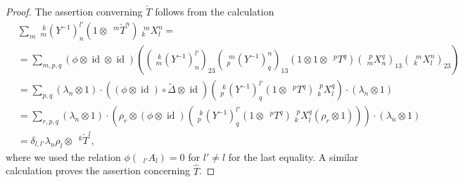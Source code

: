 \documentclass[12pt]{article}
\theoremstyle{change}
\DeclareMathOperator{\id}{id}
\newcommand{\Gr}[5]{\;{}^{\;#2}_{#4}#1_{#5}^{#3}}%
\newcommand{\Gru}[3]{\;{}^{\;#2}#1^{#3}}
\newcommand{\Grd}[3]{\;{}_{\;#2}#1_{#3}}
\theoremstyle{definition}
\numberwithin{equation}{section}
\begin{document}
\begin{proof}
 The assertion converning $\check{T}$ follows
  from the calculation
  \begin{align*}
    &\sum_{m} \Gr{(Y^{-1})}{k}{l'}{m}{n}(1 \otimes
    \Gru{\check{T}}{m}{n})\Gr{X}{m}{n}{k}{l} = \\
    &=\sum_{m,p,q} (\phi \otimes \id \otimes
    \id)\left(\left(\Gr{(Y^{-1})}{k}{l'}{m}{n}\right)_{23}
      \left(\Gr{(Y^{-1})}{m}{n}{p}{q}\right)_{13}(1 \otimes 1 \otimes
      \Gru{T}{p}{q})\left(\Gr{X}{p}{q}{m}{n}\right)_{13}\left(\Gr{X}{m}{n}{k}{l}\right)_{23}\right)
    \\
    &= \sum_{p,q} (\lambda_{n} \otimes 1) \cdot ((\phi \otimes \id)
    \circ \tilde \Delta \otimes \id)\left(\Gr{(Y^{-1})}{k}{l'}{p}{q}(1
      \otimes \Gru{T}{p}{q})\Gr{X}{p}{q}{k}{l}\right) \cdot
    (\lambda_{n} \otimes 1)
    \\
    &= \sum_{r,p,q} (\lambda_{n} \otimes 1) \cdot \left(\rho_{r}
      \otimes (\phi \otimes \id)\left(\Gr{(Y^{-1})}{k}{l'}{p}{q}(1 
      \otimes \Gru{T}{p}{q})\Gr{X}{p}{q}{k}{l}(\rho_{r} \otimes
      1)\right)\right) \cdot (\lambda_{n} \otimes 1) \\
  &= \delta_{l,l'}\lambda_{n}\rho_{l} \otimes \Gru{\check{T}}{k}{l},
  \end{align*}
  where we used the relation $\phi(\Grd{A}{l'}{l})=0$ for $l'\neq l$
  for the last equality. A similar calculation proves the assertion
  concerning $\hat{T}$. 
\end{proof}

\end{document}
